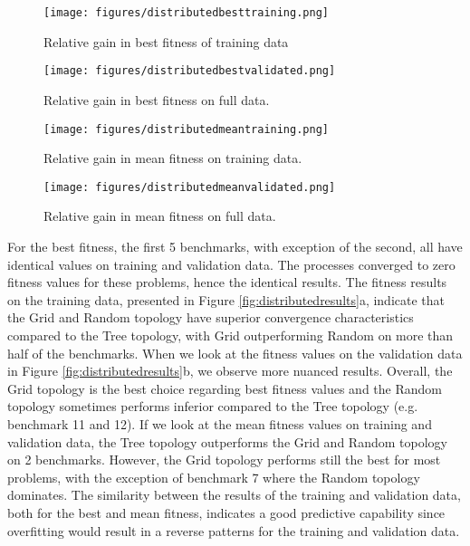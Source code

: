  \begin{figure*}
    \centering
    \begin{subfigure}{0.5\textwidth}
    \centering
        \texttt{[image: figures/distributedbesttraining.png]}
        \caption{Relative gain in best fitness of training data}
    \end{subfigure}%
    \begin{subfigure}{0.5\textwidth}
    \centering
        \texttt{[image: figures/distributedbestvalidated.png]}
        \caption{Relative gain in best fitness on full data.}
    \end{subfigure}
        \begin{subfigure}{0.5\textwidth}
    \centering
        \texttt{[image: figures/distributedmeantraining.png]}
        \caption{Relative gain in mean fitness on training data.}
    \end{subfigure}%
    \begin{subfigure}{0.5\textwidth}
    \centering
        \texttt{[image: figures/distributedmeanvalidated.png]}
        \caption{Relative gain in mean fitness on full data.}
    \end{subfigure}
    \caption{Convergence differences between topologies.}
    \label{fig:distributedresults}
\end{figure*}

For the best fitness, the first 5 benchmarks, with exception of the second, all have identical values on training and validation data. The processes converged to zero fitness values for these problems, hence the identical results. 
The fitness results on the training data, presented in Figure \ref{fig:distributedresults}a, indicate that the Grid and Random topology have superior convergence characteristics compared to the Tree topology, with Grid outperforming Random on more than half of the benchmarks. When we look at the fitness values on the validation data in Figure \ref{fig:distributedresults}b, we observe more nuanced results. Overall, the Grid topology is the best choice regarding best fitness values and the Random topology sometimes performs inferior compared to the Tree topology (e.g. benchmark 11 and 12). If we look at the mean fitness values on training and validation data, the Tree topology outperforms the Grid and Random topology on 2 benchmarks. However, the Grid topology performs still the best for most problems, with the exception of benchmark 7 where the Random topology dominates. The similarity between the results of the training and validation data, both for the best and mean fitness, indicates a good predictive capability since overfitting would result in a reverse patterns for the training and validation data. 

